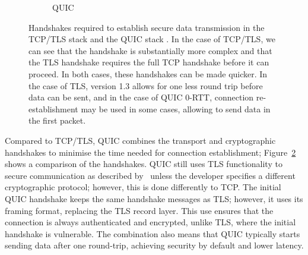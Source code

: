 \begin{figure}[t]
\begin{center}
\begin{subfigure}[b]{0.45\textwidth}
            \caption{QUIC}
            \label{fig:handshakes:quic}
        \end{subfigure}
        \caption{Handshakes required to establish secure data transmission in the TCP/TLS stack  and the QUIC stack . In the case of TCP/TLS, we can see that the handshake is substantially more complex and that the TLS handshake requires the full TCP handshake before it can proceed. In both cases, these handshakes can be made quicker. In the case of TLS, version 1.3 allows for one less round trip before data can be sent, and in the case of QUIC 0-RTT, connection re-establishment may be used in some cases, allowing to send data in the first packet.}
        \label{fig:handshakes_comparison}
    \end{center}
\end{figure}

Compared to TCP/TLS, QUIC combines the transport and cryptographic handshakes to minimise the time needed for connection establishment; Figure~\ref{fig:handshakes_comparison} shows a comparison of the handshakes.
QUIC still uses TLS functionality to secure communication as described by~\citet{thomson_using_2021} unless the developer specifies a different cryptographic protocol; however, this is done differently to TCP.
The initial QUIC handshake keeps the same handshake messages as TLS; however, it uses its framing format, replacing the TLS record layer.
This use ensures that the connection is always authenticated and encrypted, unlike TLS, where the initial handshake is vulnerable.
The combination also means that QUIC typically starts sending data after one round-trip, achieving security by default and lower latency.
